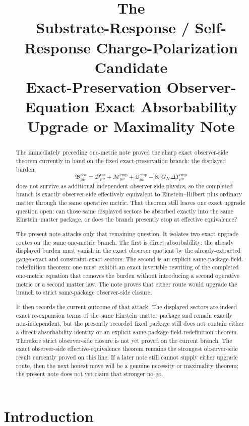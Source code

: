 \documentclass[11pt]{article}
\title{\textbf{The \TheoryName{}}\\[0.4em]
\large Substrate-Response / Self-Response Charge-Polarization Candidate\\
\large Exact-Preservation Observer-Equation Exact Absorbability Upgrade or Maximality Note}
\author{}
\date{}
\newcommand{\ResidualDec}{\mathcal D_{\mu\nu}^{\mathrm{res}}}
\newcommand{\CompMix}{\mathcal M_{\mu\nu}^{\mathrm{cmp}}}
\newcommand{\CompQuad}{\mathcal Q_{\mu\nu}^{\mathrm{cmp}}}
\newcommand{\DeltaTComp}{\Delta T_{\mu\nu}^{\mathrm{cmp}}}
\newcommand{\ObsBurden}{\mathfrak B_{\mu\nu}^{\mathrm{obs}}}
\begin{document}
\maketitle

\begin{abstract}
The immediately preceding one-metric note proved the sharp exact observer-side theorem currently in hand on the fixed exact-preservation branch: the displayed burden
\[
\ObsBurden
=
\ResidualDec+\CompMix+\CompQuad-8\pi G_N\,\DeltaTComp
\]
does not survive as additional independent observer-side physics, so the completed branch is exactly observer-side effectively equivalent to Einstein--Hilbert plus ordinary matter through the same operative metric. That theorem still leaves one exact upgrade question open: can those same displayed sectors be absorbed exactly into the same Einstein--matter package, or does the branch presently stop at effective equivalence?

The present note attacks only that remaining question. It isolates two exact upgrade routes on the same one-metric branch. The first is direct absorbability: the already displayed burden must vanish in the exact observer quotient by the already-extracted gauge-exact and constraint-exact sectors. The second is an explicit same-package field-redefinition theorem: one must exhibit an exact invertible rewriting of the completed one-metric equation that removes the burden without introducing a second operative metric or a second matter law. The note proves that either route would upgrade the branch to strict same-package observer-side closure.

It then records the current outcome of that attack. The displayed sectors are indeed exact re-expansion terms of the same Einstein--matter package and remain exactly non-independent, but the presently recorded fixed package still does not contain either a direct absorbability identity or an explicit same-package field-redefinition theorem. Therefore strict observer-side closure is not yet proved on the current branch. The exact observer-side effective-equivalence theorem remains the strongest observer-side result currently proved on this line. If a later note still cannot supply either upgrade route, then the next honest move will be a genuine necessity or maximality theorem; the present note does not yet claim that stronger no-go.
\end{abstract}

\section{Introduction}
\end{document}
